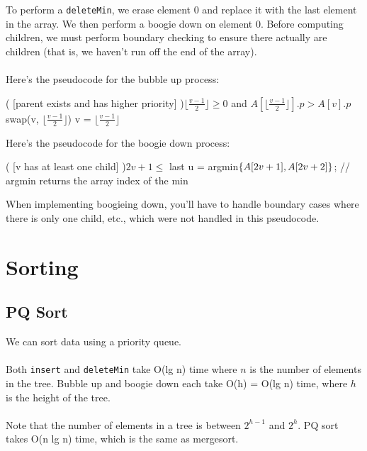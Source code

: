 \documentclass[]{article}
\theoremstyle{definition}
\DeclarePairedDelimiter{\set}{\lbrace}{\rbrace}
\begin{document}
\begin{enumerate}
						\\ \\
						To perform a \verb+deleteMin+, we erase element 0 and replace it with the last element in the array. We then perform a boogie down on element 0. Before computing children, we must perform boundary checking to ensure there actually are children (that is, we haven't run off the end of the array).
						\\ \\
						Here's the pseudocode for the bubble up process: \\
						\begin{algorithm}[H]
							\While( [parent exists and has higher priority] ){$\lfloor \frac{v - 1}{2} \rfloor \ge 0$ and $A[\lfloor \frac{v - 1}{2} \rfloor].p > A[v].p$}{
								swap(v, $\lfloor \frac{v - 1}{2} \rfloor$)\;
								v = $\lfloor \frac{v - 1}{2} \rfloor$\;
							}
						\end{algorithm}

						Here's the pseudocode for the boogie down process: \\
						\begin{algorithm}[H]
							\While( [v has at least one child] ){$2v + 1 \le$ last}{
								u = argmin$\set{A[2v + 1], A[2v + 2]}$; // argmin returns the array index of the min \\
							}
						\end{algorithm}

						When implementing boogieing down, you'll have to handle boundary cases where there is only one child, etc., which were not handled in this pseudocode.
				\end{enumerate}
	\section{Sorting}
		\subsection{PQ Sort}
			We can sort data using a priority queue. \\ \\
			Both \verb+insert+ and \verb+deleteMin+ take O(lg n) time where $n$ is the number of elements in the tree. Bubble up and boogie down each take O(h) = O(lg n) time, where $h$ is the height of the tree.
			\\ \\
			Note that the number of elements in a tree is between $2^{h - 1}$ and $2^h$. PQ sort takes O(n lg n) time, which is the same as mergesort.
\end{document}
